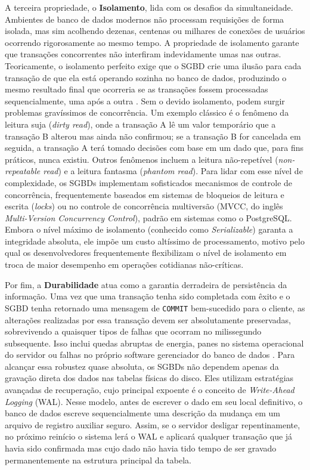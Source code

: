 A terceira propriedade, o \textbf{Isolamento}, lida com os desafios da simultaneidade. Ambientes de banco de dados modernos não processam requisições de forma isolada, mas sim acolhendo dezenas, centenas ou milhares de conexões de usuários ocorrendo rigorosamente ao mesmo tempo. A propriedade de isolamento garante que transações concorrentes não interfiram indevidamente umas nas outras. Teoricamente, o isolamento perfeito exige que o SGBD crie uma ilusão para cada transação de que ela está operando sozinha no banco de dados, produzindo o mesmo resultado final que ocorreria se as transações fossem processadas sequencialmente, uma após a outra \cite{silberschatz2020sistemas}. Sem o devido isolamento, podem surgir problemas gravíssimos de concorrência. Um exemplo clássico é o fenômeno da leitura suja (\textit{dirty read}), onde a transação A lê um valor temporário que a transação B alterou mas ainda não confirmou; se a transação B for cancelada em seguida, a transação A terá tomado decisões com base em um dado que, para fins práticos, nunca existiu. Outros fenômenos incluem a leitura não-repetível (\textit{non-repeatable read}) e a leitura fantasma (\textit{phantom read}). Para lidar com esse nível de complexidade, os SGBDs implementam sofisticados mecanismos de controle de concorrência, frequentemente baseados em sistemas de bloqueios de leitura e escrita (\textit{locks}) ou no controle de concorrência multiversão (MVCC, do inglês \textit{Multi-Version Concurrency Control}), padrão em sistemas como o PostgreSQL. Embora o nível máximo de isolamento (conhecido como \textit{Serializable}) garanta a integridade absoluta, ele impõe um custo altíssimo de processamento, motivo pelo qual os desenvolvedores frequentemente flexibilizam o nível de isolamento em troca de maior desempenho em operações cotidianas não-críticas.

Por fim, a \textbf{Durabilidade} atua como a garantia derradeira de persistência da informação. Uma vez que uma transação tenha sido completada com êxito e o SGBD tenha retornado uma mensagem de \texttt{COMMIT} bem-sucedido para o cliente, as alterações realizadas por essa transação devem ser absolutamente preservadas, sobrevivendo a quaisquer tipos de falhas que ocorram no milissegundo subsequente. Isso inclui quedas abruptas de energia, panes no sistema operacional do servidor ou falhas no próprio software gerenciador do banco de dados \cite{ramakrishnan2011}. Para alcançar essa robustez quase absoluta, os SGBDs não dependem apenas da gravação direta dos dados nas tabelas físicas do disco. Eles utilizam estratégias avançadas de recuperação, cujo principal expoente é o conceito de \textit{Write-Ahead Logging} (WAL). Nesse modelo, antes de escrever o dado em seu local definitivo, o banco de dados escreve sequencialmente uma descrição da mudança em um arquivo de registro auxiliar seguro. Assim, se o servidor desligar repentinamente, no próximo reinício o sistema lerá o WAL e aplicará qualquer transação que já havia sido confirmada mas cujo dado não havia tido tempo de ser gravado permanentemente na estrutura principal da tabela.

